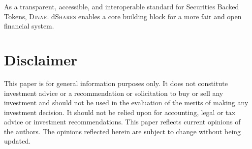 \documentclass[sigconf,nonacm,prologue,table]{acmart}
\newcommand{\dshares}{\textsc{Dinari} d\textsc{Shares} }
\begin{document}
As a transparent, accessible, and interoperable standard for Securities Backed Tokens, \dshares enables a core building block for a more fair and open financial system.

% 
% 

\section*{Disclaimer}

This paper is for general information purposes only. It does not constitute investment advice or a recommendation or solicitation to buy or sell any investment and should not be used in the evaluation of the merits of making any investment decision. It should not be relied upon for accounting, legal or tax advice or investment recommendations.  This paper reflects current opinions of the authors. The opinions reflected herein are subject to change without being updated. 

{}
\end{document}
